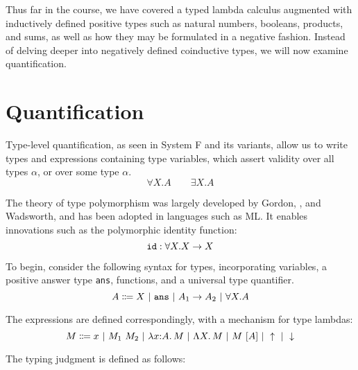 \documentclass{article}
\begin{document}
\maketitle

Thus far in the course, we have covered a typed lambda calculus augmented with inductively defined
positive types such as natural numbers, booleans, products, and sums, as well as how they may be
formulated in a negative fashion. Instead of delving deeper into negatively defined coinductive
types, we will now examine quantification.

\section{Quantification}

Type-level quantification, as seen in System F and its variants, allow us to write types and expressions
containing type variables, which assert validity over all types $\alpha$, or over some type $\alpha$.
\[ \forall X. A \qquad \exists X.A \]

The theory of type polymorphism was largely developed by Gordon, \cite{Milner}, and Wadsworth, and
has been adopted in languages such as ML. It enables innovations such as the polymorphic identity
function:
\[ \texttt{id} : \forall X. X \to X \]

To begin, consider the following syntax for types, incorporating variables, a positive answer type
\texttt{ans}, functions, and a universal type quantifier.
\[ A \Coloneqq X~|~\texttt{ans}~|~A_1 \to A_2~|~\forall X. A \]

The expressions are defined correspondingly, with a mechanism for type lambdas:
\[ M \Coloneqq x~|~M_1\ M_2~|~\lambda x {:} A.\, M~|~\Lambda X.\, M~|~M\ [A]~|~\uparrow~|~\downarrow \]

The typing judgment is defined as follows:
\end{document}
